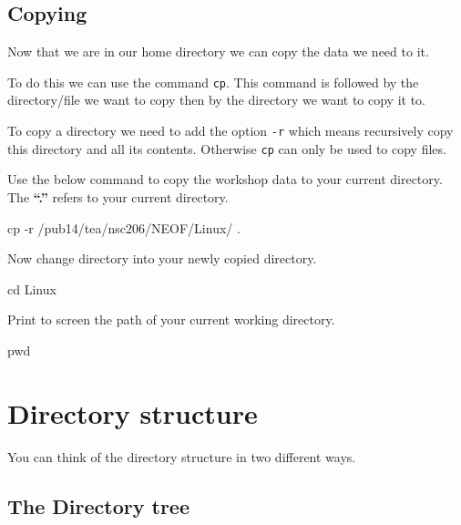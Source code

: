 \documentclass[
  letterpaper,
  DIV=11,
  numbers=noendperiod]{scrreprt}
\newenvironment{Shaded}{\begin{snugshade}}{\end{snugshade}}
\newcommand{\AttributeTok}[1]{\textcolor[rgb]{0.40,0.45,0.13}{#1}}
\newcommand{\BuiltInTok}[1]{\textcolor[rgb]{0.00,0.23,0.31}{#1}}
\newcommand{\FunctionTok}[1]{\textcolor[rgb]{0.28,0.35,0.67}{#1}}
\newcommand{\NormalTok}[1]{\textcolor[rgb]{0.00,0.23,0.31}{#1}}
\begin{document}
\subsection{Copying}\label{copying}

Now that we are in our home directory we can copy the data we need to
it.

To do this we can use the command \texttt{cp}. This command is followed
by the directory/file we want to copy then by the directory we want to
copy it to.

To copy a directory we need to add the option \texttt{-r} which means
recursively copy this directory and all its contents. Otherwise
\texttt{cp} can only be used to copy files.

Use the below command to copy the workshop data to your current
directory. The \textbf{``.''} refers to your current directory.

\begin{Shaded}
\begin{Highlighting}[]
\FunctionTok{cp} \AttributeTok{{-}r}\NormalTok{ /pub14/tea/nsc206/NEOF/Linux/ .}
\end{Highlighting}
\end{Shaded}

Now change directory into your newly copied directory.

\begin{Shaded}
\begin{Highlighting}[]
\BuiltInTok{cd}\NormalTok{ Linux}
\end{Highlighting}
\end{Shaded}

Print to screen the path of your current working directory.

\begin{Shaded}
\begin{Highlighting}[]
\BuiltInTok{pwd}
\end{Highlighting}
\end{Shaded}

\section{Directory structure}\label{directory-structure}

You can think of the directory structure in two different ways.

\subsection{The Directory tree}\label{the-directory-tree}
\end{document}
